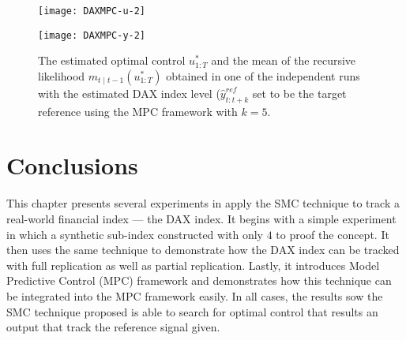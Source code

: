 \begin{figure}[htbp]
\centering
    \begin{minipage}{0.5\textwidth}
        \centering
        \texttt{[image: DAXMPC-u-2]}
    \end{minipage}%
    \begin{minipage}{0.5\textwidth}
        \centering
        \texttt{[image: DAXMPC-y-2]}
    \end{minipage}
\caption{The estimated optimal control $u^*_{1:T}$ and the mean of the recursive likelihood $m_{t \mid t-1}(u^*_{1:T})$ obtained in one of the independent runs with the estimated DAX index level ($\hat{y}^{ref}_{t:t+k}$ set to be the target reference using the MPC framework with $k=5$.}
\label{fig:mpc2}
\end{figure}

\section{Conclusions}
\label{sec:conclusion5}
This chapter presents several experiments in apply the SMC technique to track a real-world financial index --- the DAX index.  It begins with a simple experiment in which a synthetic sub-index constructed with only $4$ to proof the concept. It then uses the same technique to demonstrate how the DAX index can be tracked with full replication as well as partial replication. Lastly, it introduces Model Predictive Control (MPC) framework and demonstrates how this technique can be integrated into the MPC framework easily. In all cases, the results sow the SMC technique proposed is able to search for optimal control that results an output that track the reference signal given.
